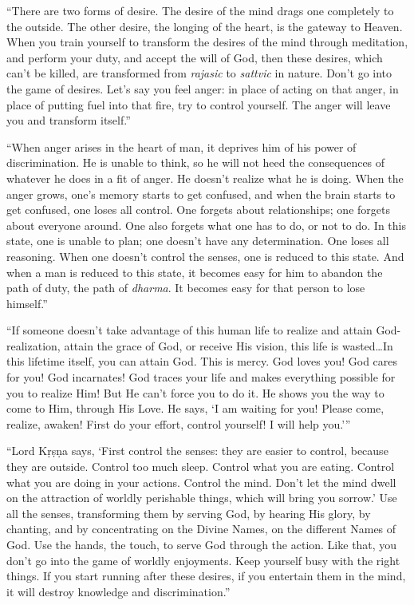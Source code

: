 \documentclass[12pt, twoside, openright]{memoir}
\begin{document}
\enquote{There are two forms of desire. The desire of the mind drags one completely to the outside. The other desire, the longing of the heart, is the gateway to Heaven. When you train yourself to transform the desires of the mind through meditation, and perform your duty, and accept the will of God, then these desires, which can’t be killed, are transformed from \textit{rajasic} to \textit{sattvic} in nature. Don’t go into the game of desires. Let’s say you feel anger: in place of acting on that anger, in place of putting fuel into that fire, try to control yourself. The anger will leave you and transform itself.}

\enquote{When anger arises in the heart of man, it deprives him of his power of discrimination. He is unable to think, so he will not heed the consequences of whatever he does in a fit of anger. He doesn’t realize what he is doing. When the anger grows, one’s memory starts to get confused, and when the brain starts to get confused, one loses all control. One forgets about relationships; one forgets about everyone around. One also forgets what one has to do, or not to do. In this state, one is unable to plan; one doesn’t have any determination. One loses all reasoning. When one doesn’t control the senses, one is reduced to this state. And when a man is reduced to this state, it becomes easy for him to abandon the path of duty, the path of \textit{dharma}. It becomes easy for that person to lose himself.}

\enquote{If someone doesn’t take advantage of this human life to realize and attain God-realization, attain the grace of God, or receive His vision, this life is wasted\ldots In this lifetime itself, you can attain God. This is mercy. God loves you! God cares for you! God incarnates! God traces your life and makes everything possible for you to realize Him! But He can’t force you to do it. He shows you the way to come to Him, through His Love. He says, \enquote{I am waiting for you! Please come, realize, awaken! First do your effort, control yourself! I will help you.}}

\enquote{Lord Kṛṣṇa says, \enquote{First control the senses: they are easier to control, because they are outside. Control too much sleep. Control what you are eating. Control what you are doing in your actions. Control the mind. Don’t let the mind dwell on the attraction of worldly perishable things, which will bring you sorrow.} Use all the senses, transforming them by serving God, by hearing His glory, by chanting, and by concentrating on the Divine Names, on the different Names of God. Use the hands, the touch, to serve God through the action. Like that, you don’t go into the game of worldly enjoyments. Keep yourself busy with the right things. If you start running after these desires, if you entertain them in the mind, it will destroy knowledge and discrimination.}
\end{document}
